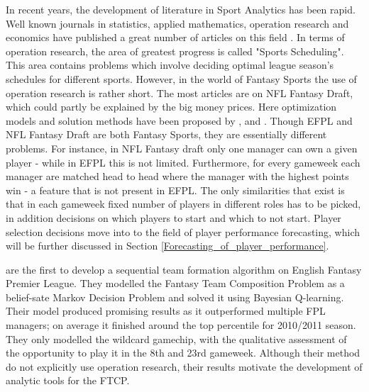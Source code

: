 In recent years, the development of literature in Sport Analytics has been rapid. Well known journals in statistics, applied mathematics, operation research and economics have published a great number of articles on this field \citep{Coleman}. In terms of operation research, the area of greatest progress is called "Sports Scheduling". This area contains problems which involve deciding optimal league season's schedules for different sports. However, in the world of Fantasy Sports the use of operation research is rather short. The most articles are on NFL Fantasy Draft, which could partly be explained by the big money prices. Here optimization models and solution methods have been proposed by \cite{Fry}, \cite{Gibson} and \cite{Becker}. Though EFPL and NFL Fantasy Draft are both Fantasy Sports, they are essentially different problems. For instance, in NFL Fantasy draft
only one manager can own a given player - while in EFPL this is not limited. Furthermore, for every gameweek each manager are matched head to head where the manager with the highest points win - a feature that is not present in EFPL. The only similarities that exist is that in each gameweek fixed number of players in different roles has to be picked, in addition decisions on which players to start and which to not start. Player selection decisions move into to the field of player performance forecasting, which will be further discussed in Section \ref{Forecasting_of_player_performance}.

\begin{comment}
- skrive om at OR ikke brukes mye Fantasy Sports og det er lite litteratur på det. Av det lille som finnes av artikler, handler de fleste om OR i NFL Fantasy draft og det kan til en viss grad skyldes pengeincentive. 
- Nevne Gibson, Fry/SUMMERS og Becker/Sun, men deretter skrive at NFL Fantasy Draft er et helt annerledes spill fra FTCP og kun til felles at det er fantasy spill. 

"For instance" at kun en spiller eies av en manager, og dermed må man ta hensyn til competitor's actions. 
\end{comment}

\newpar

\cite{Matthews} are the first to develop a sequential team formation algorithm on English Fantasy Premier League. They modelled the Fantasy Team Composition Problem as a belief-sate Markov Decision Problem and solved it using Bayesian Q-learning. Their model produced promising results as it outperformed multiple FPL managers; on average it finished around the top percentile for 2010/2011 season. They only modelled the wildcard gamechip, with the qualitative assessment of the opportunity to play it in the 8th and 23rd gameweek. Although their method do not explicitly use operation research, their results motivate the development of analytic tools for the FTCP. 

